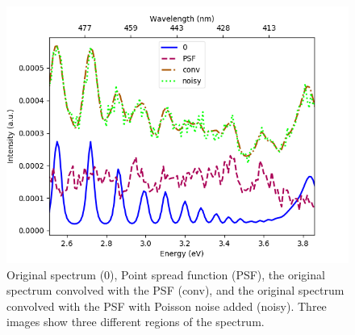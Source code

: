 \documentclass[12pt, titlepage]{article}
\begin{document}
\begin{figure}
    \includegraphics[scale=0.4]{Reference_spectra3.png}
    \caption{Original spectrum (0), Point spread function (PSF), the original spectrum convolved with the PSF (conv), and the original spectrum convolved with the PSF with Poisson noise added (noisy). Three images show three different regions of the spectrum.}
\end{figure}
\end{document}
